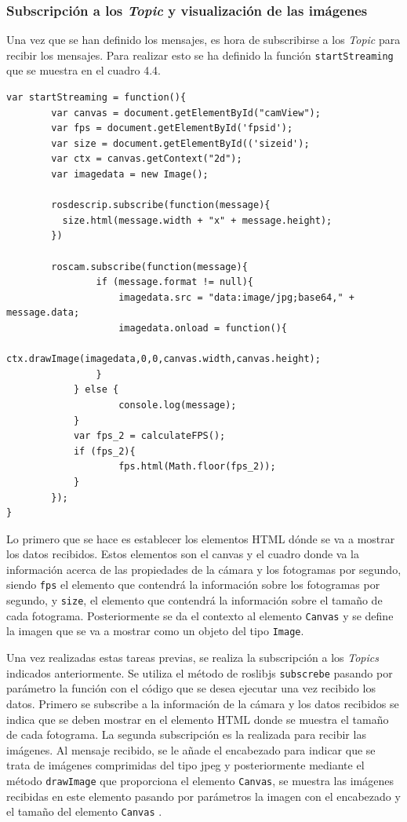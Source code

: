 \subsubsection{Subscripción a los \textit{Topic} y visualización de las imágenes}

Una vez que se han definido los mensajes, es hora de subscribirse a los \textit{Topic} para recibir los mensajes. Para realizar esto se ha definido la función \texttt{startStreaming} que se muestra en el cuadro 4.4.

\begin{lstlisting}[caption= Subscripción y visualización de las imágenes, label=cod.subscribecamviz]
var startStreaming = function(){
        var canvas = document.getElementById("camView");
        var fps = document.getElementById('fpsid');
        var size = document.getElementById(('sizeid');
        var ctx = canvas.getContext("2d");
        var imagedata = new Image();
        
        rosdescrip.subscribe(function(message){
          size.html(message.width + "x" + message.height);
        })
        
        roscam.subscribe(function(message){
        		if (message.format != null){
            		imagedata.src = "data:image/jpg;base64," + message.data;
            		imagedata.onload = function(){
              		ctx.drawImage(imagedata,0,0,canvas.width,canvas.height);
            	}
          	} else {
            		console.log(message);
          	}
          	var fps_2 = calculateFPS();
          	if (fps_2){
             		fps.html(Math.floor(fps_2));
          	}
      	});
}
\end{lstlisting}

Lo primero que se hace es establecer los elementos HTML dónde se va a mostrar los datos recibidos. Estos elementos son el canvas y el cuadro donde va la información acerca de las propiedades de la cámara y los fotogramas por segundo, siendo \texttt{fps} el elemento que contendrá la información sobre los fotogramas por segundo, y \texttt{size}, el elemento que contendrá la información sobre el tamaño de cada fotograma. Posteriormente se da el contexto al elemento \texttt{Canvas}  y se define la imagen que se va a mostrar como un objeto del tipo \texttt{Image}.

Una vez realizadas estas tareas previas, se realiza la subscripción a los \textit{Topics} indicados anteriormente. Se utiliza el método de roslibjs \texttt{subscrebe} pasando por parámetro la función con el código que se desea ejecutar una vez recibido los datos. Primero se subscribe a la información de la cámara y los datos recibidos se indica que se deben mostrar en el elemento HTML donde se muestra el tamaño de cada fotograma.
La segunda subscripción es la realizada para recibir las imágenes. Al mensaje recibido, se le añade el encabezado para indicar que se trata de imágenes comprimidas del tipo jpeg y posteriormente mediante el método \texttt{drawImage} que proporciona el elemento \texttt{Canvas}, se muestra las imágenes recibidas en este elemento pasando por parámetros la imagen con el encabezado y el tamaño del elemento \texttt{Canvas} .

